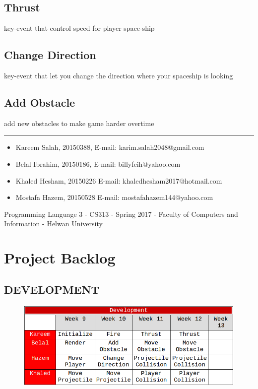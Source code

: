 \documentclass[]{article}
\begin{document}
\subsection{Thrust}
key-event that control speed for player space-ship

\subsection{Change Direction}
key-event that let you change the direction where your spaceship is looking

\subsection{Add Obstacle}
add new obstacles to make game harder overtime 

\noindent\rule{12cm}{0.5pt}

\begin{itemize}

  \item Kareem Salah, 20150388,
  \newline
  E-mail: karim.salah2048@gmail.com
  
  \item Belal Ibrahim, 20150186,
  \newline
  E-mail: billyfcih@yahoo.com
  
  \item Khaled Hesham, 20150226
  \newline
  E-mail: khaledhesham2017@hotmail.com
  
  \item Mostafa Hazem, 20150528
  \newline
  E-mail: mostafahazem144@yahoo.com
  
\end{itemize}
Programming Language 3 - CS313 - Spring 2017 - Faculty of
Computers and Information - Helwan University

\section{Project Backlog}

\subsection{DEVELOPMENT}

\begin{figure}[H]
\centering
\includegraphics[scale=0.5]{./Develop.png}
\end{figure}
\end{document}
